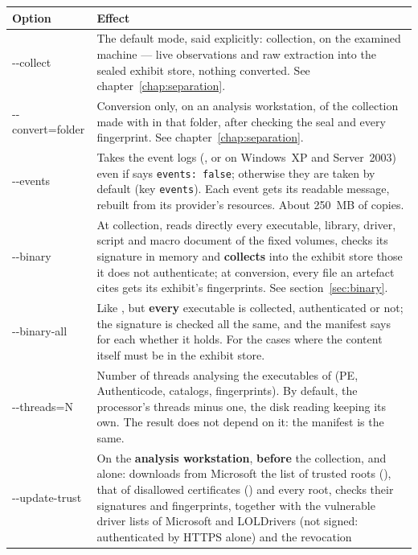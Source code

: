 \documentclass[11pt,a4paper,oneside]{report}
\begin{document}
\begin{longtable}{@{}>{\ttfamily}L{3.2cm}L{11.2cm}@{}}
\toprule
\normalfont\bfseries Option & \bfseries Effect \\
\midrule
\endhead
-{}-collect & The default mode, said explicitly: collection, on the examined
  machine — live observations and raw extraction into the sealed exhibit store,
  nothing converted. See chapter~\ref{chap:separation}. \\
-{}-convert=folder & Conversion only, on an analysis workstation, of the
  collection made with  in that folder, after checking the seal
  and every fingerprint. See chapter~\ref{chap:separation}. \\
-{}-events & Takes the event logs (, or  on
  Windows~XP and Server~2003) even if 
  says \texttt{events: false}; otherwise they are taken by default (key
  \texttt{events}). Each event gets its readable message, rebuilt from its
  provider's resources. About 250~MB of copies. \\
-{}-binary & At collection, reads directly every executable, library, driver,
  script and macro document of the fixed volumes, checks its signature in memory
  and \textbf{collects} into the exhibit store those it does not authenticate;
  at conversion, every file an artefact cites gets its exhibit's fingerprints.
  See section~\ref{sec:binary}. \\
-{}-binary-all & Like , but \textbf{every} executable is collected,
  authenticated or not; the signature is checked all the same, and the manifest
  says for each whether it holds. For the cases where the content itself must
  be in the exhibit store. \\
-{}-threads=N & Number of threads analysing the executables of 
   (PE, Authenticode, catalogs, fingerprints). By default, the
  processor's threads minus one, the disk reading keeping its own. The result
  does not depend on it: the manifest is the same. \\
-{}-update-trust\newline [=folder] & On the \textbf{analysis workstation}, \textbf{before} the
  collection, and alone: downloads from Microsoft the list of trusted roots
  (), that of disallowed certificates
  () and every root, checks their signatures and
  fingerprints, together with the vulnerable driver lists of Microsoft and
  LOLDrivers (not signed: authenticated by HTTPS alone) and the revocation

\end{longtable}
\end{document}
